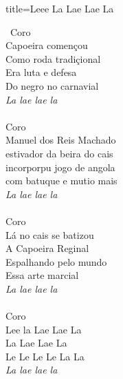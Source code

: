 \documentclass[fontsize=14pt, twoside]{scrreprt}
\begin{document}
\begin{multicols*}{2}
\begin{song}{title={Leee La Lae Lae La}}
\begin{verse*}
            \
            Coro\\
            Capoeira començou\\
            Como roda tradiçional\\
            Era luta e defesa\\
            Do negro no carnavial\\
            \textit{La lae lae la}\\
\\
            Coro\\
            Manuel dos Reis Machado\\
            estivador da beira do cais\\
            incorporpu jogo de angola\\
            com batuque e mutio mais\\
            \textit{La lae lae la}\\
\\
            Coro\\
            Lá no cais se batizou\\
            A Capoeira Reginal\\
            Espalhando pelo mundo\\
            Essa arte marcial\\
            \textit{La lae lae la}\\
\\
            Coro\\
            Lee la Lae Lae La\\
            La Lae Lae La\\
            Le Le Le Le La La\\
            \textit{La lae lae la}\\
        \end{verse*}
\end{song}



\end{multicols*}
\end{document}
